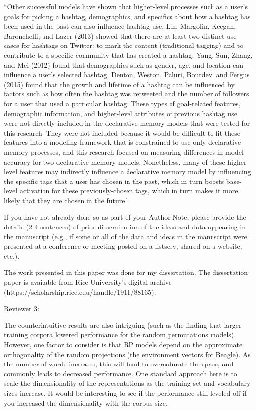 \documentclass[answers,12pt]{exam}
\begin{document}
\begin{questions}
\begin{solution}
``Other successful models have shown that higher-level processes such as a user’s goals for picking a hashtag, demographics, and specifics about how a hashtag has been used in the past can also influence hashtag use. Lin, Margolin, Keegan, Baronchelli, and Lazer (2013) showed that there are at least two distinct use cases for hashtags on Twitter: to mark the content (traditional tagging) and to contribute to a specific community that has created a hashtag. Yang, Sun, Zhang, and Mei (2012) found that demographics such as gender, age, and location can influence a user’s selected hashtag. Denton, Weston, Paluri, Bourdev, and Fergus (2015) found that the growth and lifetime of a hashtag can be influenced by factors such as how often the hashtag was retweeted and the number of followers for a user that used a particular hashtag. These types of goal-related features, demographic information, and higher-level attributes of previous hashtag use were not directly included in the declarative memory models that were tested for this research. They were not included because it would be difficult to fit these features into a modeling framework that is constrained to use only declarative memory processes, and this research focused on measuring differences in model accuracy for two declarative memory models. Nonetheless, many of these higher-level features may indirectly influence a declarative memory model by influencing the specific tags that a user has chosen in the past, which in turn boosts base-level activation for these previously-chosen tags, which in turn makes it more likely that they are chosen in the future.''

\end{solution}

\question If you have not already done so as part of your Author Note, please provide the details (2-4 sentences) of prior dissemination of the ideas and data appearing in the manuscript (e.g., if some or all of the data and ideas in the manuscript were presented at a conference or meeting posted on a listserv, shared on a website, etc.).

\begin{solution}
The work presented in this paper was done for my dissertation.
The dissertation paper is available from Rice University's digital archive (https://scholarship.rice.edu/handle/1911/88165).
\end{solution}

Reviewer 3: 

\question The counterintuitive results are also intriguing (such as the finding that larger training corpora lowered performance for the random permutations models). However, one factor to consider is that RP models depend on the approximate orthogonality of the random projections (the environment vectors for Beagle). As the number of words increases, this will tend to oversaturate the space, and commonly leads to decreased performance. One standard approach here is to scale the dimensionality of the representations as the training set and vocabulary sizes increase. It would be interesting to see if the performance still leveled off if you increased the dimensionality with the corpus size.


\end{questions}
\end{document}
